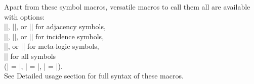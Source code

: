 %
%
%
%
%
%

Apart from these symbol macros, versatile macros to call them all
are available with options:\\
|\GTSxa[]|, |\GTSxadj[]|, or |\GTSxadjacency[]| for adjacency symbols,\\
|\GTSxi[]|, |\GTSxinc[]|, or |\GTSxincidence[]| for incidence symbols,\\
|\GTSxml[]|, or |\GTSxmetalogic[]| for meta-logic symbols,\\
|\GTSx[]{}| for all symbols\\
(| = \GTSxa[]|, | = \GTSxi[]|,
| = \GTSxml[]|).\\
See Detailed usage section for full syntax of these macros.
